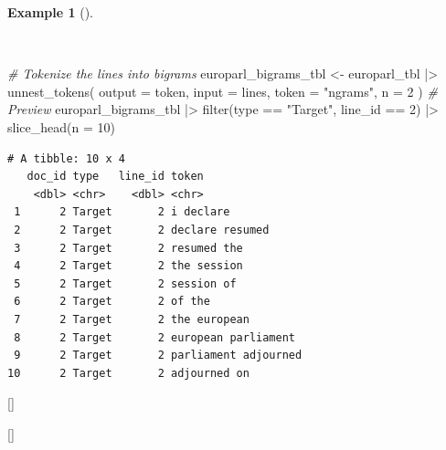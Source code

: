 \documentclass[
  letterpaper,
  krantz1]{latex/krantz-mod}
\newenvironment{Shaded}{\begin{snugshade}}{\end{snugshade}}
\newcommand{\AttributeTok}[1]{\textcolor[rgb]{0.00,0.00,0.00}{#1}}
\newcommand{\CommentTok}[1]{\textcolor[rgb]{0.00,0.00,0.00}{\textit{#1}}}
\newcommand{\DecValTok}[1]{\textcolor[rgb]{0.00,0.00,0.00}{#1}}
\newcommand{\FunctionTok}[1]{\textcolor[rgb]{0.00,0.00,0.00}{#1}}
\newcommand{\NormalTok}[1]{\textcolor[rgb]{0.00,0.00,0.00}{#1}}
\newcommand{\OtherTok}[1]{\textcolor[rgb]{0.00,0.00,0.00}{#1}}
\newcommand{\SpecialCharTok}[1]{\textcolor[rgb]{0.00,0.00,0.00}{#1}}
\newcommand{\StringTok}[1]{\textcolor[rgb]{0.00,0.00,0.00}{#1}}
\newcommand{\cindex}[1]{%
  \StrSubstitute{#1}{_}{\_}[\temp]%
  \index{\temp}%
}
\theoremstyle{definition}
\theoremstyle{definition}
\newtheorem{example}{Example}[chapter]
\theoremstyle{remark}
\begin{document}
\begin{example}[]\protect\hypertarget{exm-transform-europarl-tokenization-bigrams-tidytext}{}\label{exm-transform-europarl-tokenization-bigrams-tidytext}

~

\begin{Shaded}
\begin{Highlighting}[numbers=left,,]
\CommentTok{\# Tokenize the lines into bigrams}
\NormalTok{europarl\_bigrams\_tbl }\OtherTok{\textless{}{-}}
\NormalTok{  europarl\_tbl }\SpecialCharTok{|\textgreater{}}
  \FunctionTok{unnest\_tokens}\NormalTok{(}
    \AttributeTok{output =}\NormalTok{ token,}
    \AttributeTok{input =}\NormalTok{ lines,}
    \AttributeTok{token =} \StringTok{"ngrams"}\NormalTok{,}
    \AttributeTok{n =} \DecValTok{2}
\NormalTok{  )}
\CommentTok{\# Preview}
\NormalTok{europarl\_bigrams\_tbl }\SpecialCharTok{|\textgreater{}}
  \FunctionTok{filter}\NormalTok{(type }\SpecialCharTok{==} \StringTok{"Target"}\NormalTok{, line\_id }\SpecialCharTok{==} \DecValTok{2}\NormalTok{) }\SpecialCharTok{|\textgreater{}}
  \FunctionTok{slice\_head}\NormalTok{(}\AttributeTok{n =} \DecValTok{10}\NormalTok{)}
\end{Highlighting}
\end{Shaded}

\begin{verbatim}
# A tibble: 10 x 4
   doc_id type   line_id token               
    <dbl> <chr>    <dbl> <chr>               
 1      2 Target       2 i declare           
 2      2 Target       2 declare resumed     
 3      2 Target       2 resumed the         
 4      2 Target       2 the session         
 5      2 Target       2 session of          
 6      2 Target       2 of the              
 7      2 Target       2 the european        
 8      2 Target       2 european parliament 
 9      2 Target       2 parliament adjourned
10      2 Target       2 adjourned on        
\end{verbatim}

\cindex{==}
\cindex{unnest_tokens()}

\end{example}

\pagebreak
\end{document}
